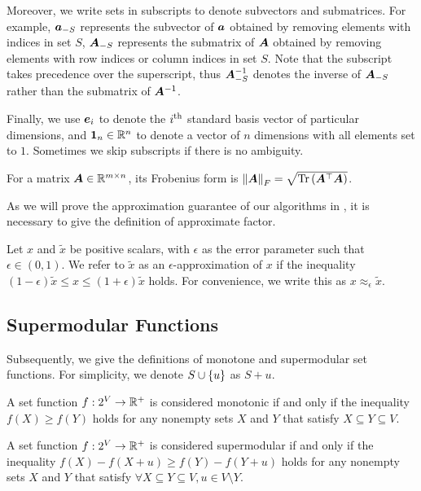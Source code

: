 \documentclass[journal]{IEEEtran}
\begin{document}
Moreover, we write sets in subscripts to denote subvectors and submatrices.
For example, \(\boldsymbol{a}_{-S}\) represents the subvector of \(\boldsymbol{a}\) obtained by removing elements with indices in set \(S\), \(\boldsymbol{A}_{-S}\) represents the submatrix of \(\boldsymbol{A}\) obtained by removing elements with row indices or column indices in set \(S\).
Note that the subscript takes precedence over the superscript, thus \(\boldsymbol{A}_{-S}^{-1}\) denotes the inverse of \(\boldsymbol{A}_{-S}\) rather than the submatrix of \(\boldsymbol{A}^{-1}\).

Finally, we use \(\boldsymbol{e}_i\) to denote the \({i}^{\rm{th}}\) standard basis vector of particular dimensions, and \(\boldsymbol{1}_n\in \mathbb{R}^n\) to denote a vector of \(n\) dimensions with all elements set to \(1\).
Sometimes we skip subscripts if there is no ambiguity.

For a matrix \(\boldsymbol{A}\in\mathbb{R}^{m\times n}\), its Frobenius form is \(\left\Vert\boldsymbol{A}\right\Vert_F=\sqrt{\mathrm{Tr}\left(\boldsymbol{A}^\top\boldsymbol{A}\right)}\).

As we will prove the approximation guarantee of our algorithms in , it is necessary to give the definition of approximate factor.

\begin{definition}
    Let \(x\) and \(\tilde{x}\) be positive scalars, with \(\epsilon\) as the error parameter such that \(\epsilon\in(0,1)\). We refer to \(\tilde{x}\) as an \(\epsilon\)-approximation of \(x\) if the inequality \((1-\epsilon)\tilde{x}\le x\le(1+\epsilon)\tilde{x}\) holds. For convenience, we write this as \(x\approx_{\epsilon}\tilde{x}\).
\end{definition}

\subsection{Supermodular Functions}

Subsequently, we give the definitions of monotone and supermodular set functions. For simplicity, we denote \(S\cup\left\{u \right\}\) as \(S+u\).

\begin{definition}[Monotonicity]
    A set function \(f:2^{V}\to\mathbb{R}^+\) is considered monotonic if and only if the inequality \(f(X)\ge f(Y)\) holds for any nonempty sets \(X\) and \(Y\) that satisfy \(X\subseteq Y\subseteq V\).
\end{definition}

\begin{definition}[Supermodularity]
    A set function \(f:2^{V}\to\mathbb{R}^+\) is considered supermodular if and only if the inequality \(f(X)-f(X+u)\ge f(Y)-f(Y+u)\) holds for any nonempty sets \(X\) and \(Y\) that satisfy \(\forall X\subseteq Y\subseteq V, u\in V\setminus Y\).
\end{definition}
\end{document}
